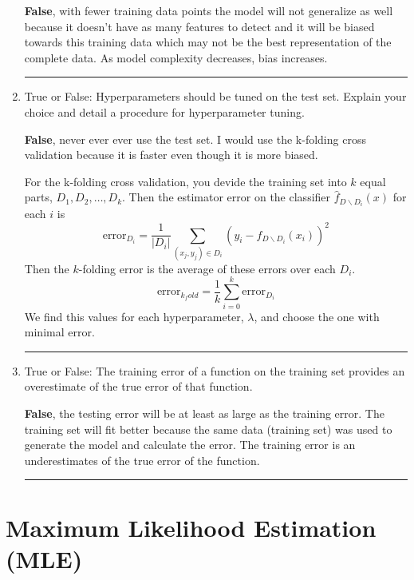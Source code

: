 \documentclass{article}
\begin{document}
\begin{aprob}
\begin{enumerate}
        \textbf{False}, with fewer training data points the model will not generalize as well because it doesn't have as many features to detect and it will be biased towards this training data which may not be the best representation of the complete data.
        As model complexity decreases, bias increases.

        \rule{\textwidth}{0.25pt}
        \newpage
        \item {} True or False: Hyperparameters should be tuned on the test set. Explain your choice and detail a procedure for hyperparameter tuning.

        \textbf{False}, never ever ever use the test set. I would use the k-folding cross validation because it is faster even though it is more biased. 

        For the k-folding cross validation, you devide the training set into $k$ equal parts, $D_1, D_2, \dots, D_k$. Then the estimator error on the classifier $\hat{f}_{D \backslash D_i} (x)$ for each $i$ is 
        $$ \text{error}_{D_i} =  \frac{1}{|{D_i}|} \sum_{(x_j,y_j)\in D_i} (y_i - \hat{f}_{D \backslash D_i} (x_i) )^2 $$
        Then the $k$-folding error is the average of these errors over each $D_i$.
        $$ \text{error}_{k_fold} = \frac{1}{k} \sum_{i=0}^k \text{error}_{D_i} $$
        We find this values for each hyperparameter, $\lambda$, and choose the one with minimal error.

        \rule{\textwidth}{0.25pt}
        \newpage
        \item {} True or False: The training error of a function on the training set provides an overestimate of the true error of that function.

        \textbf{False}, the testing error will be at least as large as the training error. The training set will fit better because the same data (training set) was used to generate the model and calculate the error. The training error is an underestimates of the true error of the function.

        \rule{\textwidth}{0.25pt}
        \newpage
    \end{enumerate}

\end{aprob}

\section*{Maximum Likelihood Estimation (MLE)}
\end{document}
